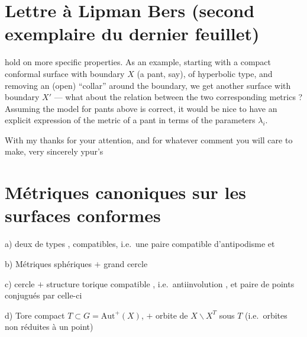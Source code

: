\documentclass[11pt,a4paper]{article}
\begin{document}
\section{Lettre à Lipman Bers (second exemplaire du dernier feuillet)}


hold on more specific properties. As an example, starting with a compact
conformal surface with boundary $X$ (a pant, say), of hyperbolic type, and
removing an (open) “collar” around the boundary, we get another surface with
boundary $X'$ — what about the relation  between the two
corresponding metrics ? Assuming the model for pants above is correct, it
would be nice to have an explicit expression of the metric of a pant in terms
of the parameters $\lambda_{i}$.

With my thanks for your attention, and for whatever comment you will care to
make, very sincerely ypur's

\section{Métriques canoniques sur les surfaces conformes}


a) deux  de types \ill{}, compatibles, i.e.\ une
paire compatible d'antipodisme et 

b) Métriques sphériques $+$ grand cercle

c) cercle $+$ structure torique compatible , i.e.\
antiinvolution  \add{\uncertain{avec} \uncertain{pts}
\uncertain{fixes}}, et paire de points conjugués par celle-ci

d) Tore compact $T \subset G = \mathrm{Aut}^{+}(X)$, $+$ orbite de
$X \smallsetminus X^{T}$ sous $T$ (i.e.\ orbites non réduites à un point)
\end{document}

